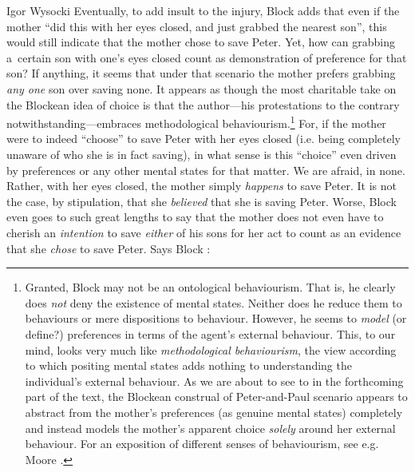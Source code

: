 \begin{artengenv}{Igor Wysocki}
Eventually, to add insult to the injury, Block 
\parencite*[][p.51]{block_response_2022} %
 adds that even if the mother ``did this with her eyes closed, and just grabbed the nearest son'', this would still indicate that the mother chose to save Peter. Yet, how can grabbing a~certain son with one's eyes closed count as demonstration of preference for that son? If anything, it seems that under that scenario the mother prefers grabbing \textit{any one} son over saving none. It appears as though the most charitable take on the Blockean idea of choice is that the author---his protestations to the contrary notwithstanding---embraces methodological behaviourism.\footnote{Granted, Block may not be an ontological behaviourism. That is, he clearly does \textit{not} deny the existence of mental states. Neither does he reduce them to behaviours or mere dispositions to behaviour. However, he seems to \textit{model} (or define?) preferences in terms of the agent's external behaviour. 
\parencite[][pp.54–55]{block_response_2022}%
This, to our mind, looks very much like \textit{methodological behaviourism}, the view according to which positing mental states adds nothing to understanding the individual's external behaviour. As we are about to see to in the forthcoming part of the text, the Blockean construal of Peter-and-Paul scenario appears to abstract from the mother's preferences (as genuine mental states) completely and instead models the mother's apparent choice \textit{solely} around her external behaviour. For an exposition of different senses of behaviourism, see e.g. Moore 
\parencite*[][]{moore_distinguishing_2001}. %
 } For, if the mother were to indeed ``choose'' to save Peter with her eyes closed (i.e. being completely unaware of who she is in fact saving), in what sense is this ``choice'' even driven by preferences or any other mental states for that matter. We are afraid, in none. Rather, with her eyes closed, the mother simply \textit{happens} to save Peter. It is not the case, by stipulation, that she \textit{believed} that she is saving Peter. Worse, Block even goes to such great lengths to say that the mother does not even have to cherish an \textit{intention} to save \textit{either} of his sons for her act to count as an evidence that she \textit{chose} to save Peter. Says Block 
\parencite*[][pp.54–55]{block_response_2022}:%





\end{artengenv}
